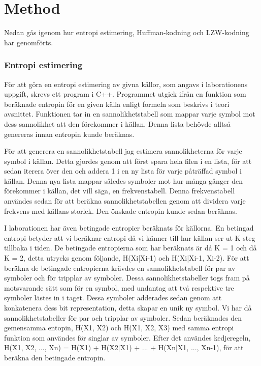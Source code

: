 
\chapter{Method}
\label{cha:method}

Nedan gås igenom hur entropi estimering, Huffman-kodning och LZW-kodning har genomförts.

\subsection{Entropi estimering}
För att göra en entropi estimering av givna källor, som angavs i laborationens uppgift, skrevs ett program i C++. Programmet utgick ifrån en funktion som beräknade entropin för en given källa enligt formeln som beskrivs i teori avsnittet. Funktionen tar in en sannolikhetstabell som mappar varje symbol mot dess sannolikhet att den förekommer i källan. Denna lista behövde alltså genereras innan entropin kunde beräknas.

För att generera en sannolikhetstabell jag estimera sannolikheterna för varje symbol i källan. Detta gjordes genom att först spara hela filen i en lista, för att sedan iterera över den och addera 1 i en ny lista för varje påträffad symbol i källan. Denna nya lista mappar således symboler mot hur många gånger den förekommer i källan, det vill säga, en frekvenstabell. Denna frekvenstabell användes sedan för att beräkna sannolikhetstabellen genom att dividera varje frekvens med källans storlek. Den önskade entropin kunde sedan beräknas.

I laborationen har även betingade entropier beräknats för källorna. En betingad entropi betyder att vi beräknar entropi då vi känner till hur källan ser ut K steg tillbaka i tiden. De betingade entropierna som har beräknats är då K = 1 och då K = 2, detta utrycks genom följande, H(Xi|Xi-1) och H(Xi|Xi-1, Xi-2). För att beräkna de betingade entropierna krävdes en sannolikhetstabell för par av symboler och för tripplar av symboler. Dessa sannolikhetstabeller togs fram på motsvarande sätt som för en symbol, med undantag att två respektive tre symboler lästes in i taget. Dessa symboler adderades sedan genom att konkatenera dess bit representation, detta skapar en unik ny symbol. Vi har då sannolikhetstabeller för par och tripplar av symboler. Sedan beräknades den gemensamma entopin, H(X1, X2) och H(X1, X2, X3) med samma entropi funktion som användes för singlar av symboler. Efter det användes kedjeregeln, H(X1, X2, ..., Xn) = H(X1) + H(X2|X1) + ... + H(Xn|X1, ..., Xn-1), för att beräkna den betingade entropin.

